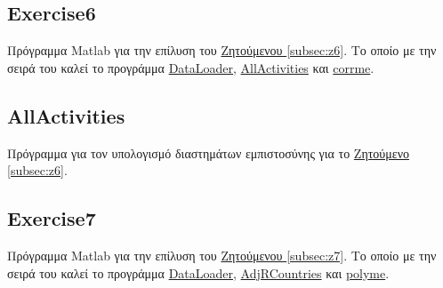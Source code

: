 \documentclass[11pt]{scrartcl} %
\begin{document}
	
	
		
\subsection{Exercise6}
\label{prog:6}
Πρόγραμμα Matlab για την επίλυση του \hyperref[subsec:z6]{Ζητούμενου \ref*{subsec:z6}}. Το οποίο με την σειρά του καλεί το προγράμμα \hyperref[prog:DataLoader]{DataLoader}, \hyperref[prog:AllActivities]{AllActivities} και \hyperref[prog:corrme]{corrme}.


\subsection{AllActivities}
\label{prog:AllActivities}
Πρόγραμμα για τον υπολογισμό διαστημάτων εμπιστοσύνης για το \hyperref[subsec:z6]{Ζητούμενο \ref*{subsec:z6}}.

	
	
	
		
\subsection{Exercise7}
\label{prog:7}
Πρόγραμμα Matlab για την επίλυση του \hyperref[subsec:z7]{Ζητούμενου \ref*{subsec:z7}}. Το οποίο με την σειρά του καλεί το προγράμμα \hyperref[prog:DataLoader]{DataLoader}, \hyperref[prog:AdjRCountries]{AdjRCountries} και \hyperref[prog:polyme]{polyme}.

\end{document}
